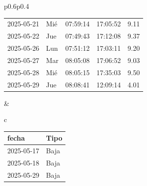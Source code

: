 \documentclass[11pt,a4paper]{article}
\newcommand{\infobox}[2]{
  \begin{tcolorbox}[
    colback=grisclaro,
    colframe=corporativo,
    title=#1,
    fonttitle=\bfseries
  ]
#2
  \end{tcolorbox}
}
\begin{document}
\begin{tabular}{p{}p{}}
{\begin{tabular}{p{2cm} p{0.6cm} p{1.2cm} p{1.2cm} r}
\rowcolor{white}%
2025-05-21 & Mié & 07:59:14 & 17:05:52 &9.11\\
\rowcolor{white}%
2025-05-22 & Jue & 07:49:43 & 17:12:08 &9.37\\
\rowcolor{white}%
2025-05-26 & Lun & 07:51:12 & 17:03:11 &9.20\\
\rowcolor{white}%
2025-05-27 & Mar & 08:05:08 & 17:06:52 &9.03\\
\rowcolor{white}%
2025-05-28 & Mié & 08:05:15 & 17:35:03 &9.50\\
\rowcolor{white}%
2025-05-29 & Jue & 08:08:41 & 12:09:14 &4.01\\

\bottomrule
\end{tabular}
}
&
\begin{tabular}{c}

\infobox{D\'ias At\'ipicos}{
\begin{tabular}{p{2cm} p{2cm}}
\toprule
\rowcolor{grisclaro} \textbf{fecha} & \textbf{Tipo}\\
\midrule

2025-05-17 & Baja\\

2025-05-18 & Baja\\

2025-05-29 & Baja\\

\bottomrule
\end{tabular}
}
\\
\\




    

    

    

    

    

    

    

    

    

    

    
        
    

    
        
    


\end{tabular}
\end{tabular}
\end{document}
